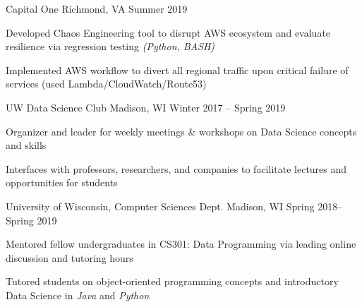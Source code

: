 \documentclass[10pt, letterpaper]{awesome-cv}
\newcommand{\col}{awesome-red}
\newcommand{\regcol}{\textcolor{\col}}
\begin{document}
\cvsubsection{\regcol{Vocational}}
\hspace*{0em}
    {Capital One}
    {Richmond, VA}
    {Summer 2019}
    {\begin{cvitems} \setlength{\itemindent}{1em}
        \item Developed Chaos Engineering tool to disrupt AWS ecosystem and evaluate resilience via regression testing \textit{(Python, BASH)}
        \item Implemented AWS workflow to divert all regional traffic upon critical failure of services (used Lambda/CloudWatch/Route53)
    \end{cvitems}}
    \vspace*{-0.7em}

\hspace*{0em}
    {UW Data Science Club}
    {Madison, WI}
    {Winter 2017 -- Spring 2019}
    {\begin{cvitems} \setlength{\itemindent}{1em}
        \item Organizer and leader for weekly meetings \& workshops on Data Science concepts and skills
        \item Interfaces with professors, researchers, and companies to facilitate lectures and opportunities for students
    \end{cvitems}}
    \vspace*{-0.7em}
    
\hspace*{0em}
    {University of Wisconsin, Computer Sciences Dept.}
    {Madison, WI}
    {Spring 2018--Spring 2019}
    {\begin{cvitems} \setlength{\itemindent}{1em}
      \item Mentored fellow undergraduates in CS301: Data Programming via leading online discussion and tutoring hours
      \item Tutored students on object-oriented programming concepts and introductory Data Science in \textit{Java} and \textit{Python}
    \end{cvitems}}  
    
\end{document}
